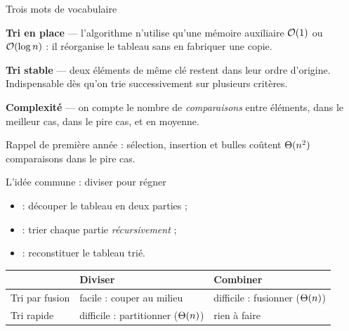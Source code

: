 \documentclass[11pt,aspectratio=169]{beamer}
\begin{document}
\begin{frame}{Trois mots de vocabulaire}
\begin{encadre}
\textbf{Tri en place} --- l'algorithme n'utilise qu'une mémoire auxiliaire
$\mathcal{O}(1)$ ou $\mathcal{O}(\log n)$ : il réorganise le tableau sans en fabriquer une copie.
\end{encadre}
\vspace{4pt}
\begin{encadre}
\textbf{Tri stable} --- deux éléments de même clé restent dans leur ordre d'origine.
Indispensable dès qu'on trie successivement sur plusieurs critères.
\end{encadre}
\vspace{4pt}
\begin{encadre}
\textbf{Complexité} --- on compte le nombre de \emph{comparaisons} entre éléments,
dans le meilleur cas, dans le pire cas, et en moyenne.
\end{encadre}
\vspace{6pt}
\centering\small
Rappel de première année : sélection, insertion et bulles coûtent
$\Theta(n^2)$ comparaisons dans le pire cas.
\end{frame}

\begin{frame}{L'idée commune : diviser pour régner}
\begin{encadre}
\begin{itemize}\setlength\itemsep{2pt}
  \item {} : découper le tableau en deux parties ;
  \item {} : trier chaque partie \emph{récursivement} ;
  \item {} : reconstituer le tableau trié.
\end{itemize}
\end{encadre}
\vspace{6pt}
\begin{center}\small
\begin{tabular}{lll}
\toprule
& \textbf{Diviser} & \textbf{Combiner}\\
\midrule
Tri par fusion & facile : couper au milieu & difficile : fusionner ($\Theta(n)$)\\
Tri rapide & difficile : partitionner ($\Theta(n)$) & rien à faire\\
\bottomrule
\end{tabular}
\end{center}
\vspace{6pt}
\centering{}
\end{frame}
\end{document}
